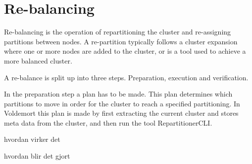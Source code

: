 \section{Re-balancing}

Re-balancing is the operation of repartitioning the cluster and re-assigning partitions between nodes. A re-partition typically follows a cluster expansion where one or more nodes are added to the cluster, or is a tool used to achieve a more balanced cluster. 

A re-balance is split up into three steps. Preparation, execution and verification.

In the preparation step a plan has to be made. This plan determines which partitions to move in order for the cluster to reach a specified partitioning. In Voldemort this plan is made by first extracting the current cluster and stores meta data from the cluster, and then run the tool RepartitionerCLI. 	



hvordan virker det


hvordan blir det gjort



